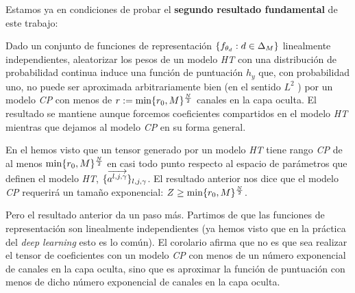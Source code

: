 Estamos ya en condiciones de probar el \textbf{segundo resultado fundamental} de este trabajo:

\begin{corolario} \label{corolario:corolario_principal_concreto}
    Dado un conjunto de funciones de representación $\{ f_{\theta_d}: d \in \Delta_{M} \}$ linealmente independientes, aleatorizar los pesos de un modelo \textit{HT} con una distribución de probabilidad continua induce una función de puntuación $h_y$ que, con probabilidad uno, no puede ser aproximada arbitrariamente bien (en el sentido $L^2$ ) por un modelo \textit{CP} con menos de $r := \min \{ r_0, M \}^{\frac{N}{2}}$ canales en la capa oculta. El resultado se mantiene aunque forcemos coeficientes compartidos en el modelo \textit{HT} mientras que dejamos al modelo \textit{CP} en su forma general.
\end{corolario}

\begin{observacion}
    En el  hemos visto que un tensor generado por un modelo \textit{HT} tiene rango \textit{CP} de al menos $\min \{ r_0, M \}^{\frac{N}{2}}$  en casi todo punto respecto al espacio de parámetros que definen el modelo \textit{HT}, $\{ \overrightarrow{a^{l, j, \gamma}} \}_{l, j, \gamma}$. El resultado anterior nos dice que el modelo \textit{CP} requerirá un tamaño exponencial: $Z \geq \min \{ r_0, M \}^{\frac{N}{2}}$.

    Pero el resultado anterior da un paso más. Partimos de que las funciones de representación son linealmente independientes (ya hemos visto que en la práctica del \textit{deep learning} esto es lo común). El corolario afirma que no es que sea  realizar el tensor de coeficientes con un modelo \textit{CP} con menos de un número exponencial de canales en la capa oculta, sino que es  aproximar la función de puntuación con menos de dicho número exponencial de canales en la capa oculta.
\end{observacion}

